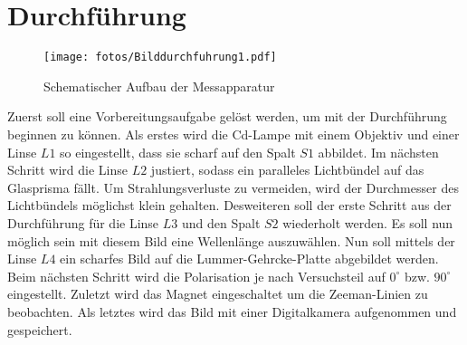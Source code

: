 \section{Durchführung}
\label{sec:Durchführung}
\begin{figure}[h]
	\centering
	\texttt{[image: fotos/Bilddurchfuhrung1.pdf]}
	\caption{Schematischer Aufbau der Messapparatur}
	\label{durch:1}
\end{figure}
Zuerst soll eine Vorbereitungsaufgabe gelöst werden, um mit der Durchführung beginnen zu können.
Als erstes wird die Cd-Lampe mit einem Objektiv und einer Linse $L1$ so eingestellt, dass sie scharf auf den Spalt $S1$ abbildet. Im nächsten Schritt wird die Linse $L2$ justiert, sodass ein paralleles Lichtbündel auf das Glasprisma fällt. Um Strahlungsverluste zu vermeiden, wird der Durchmesser des Lichtbündels möglichst klein gehalten. Desweiteren soll der erste Schritt aus der Durchführung für die Linse $L3$ und den Spalt $S2$ wiederholt werden. Es soll nun möglich sein mit diesem Bild eine Wellenlänge auszuwählen. Nun soll mittels der Linse $L4$ ein scharfes Bild auf die Lummer-Gehrcke-Platte abgebildet werden. Beim nächsten Schritt wird die Polarisation je nach Versuchsteil auf $0^{\circ}$ bzw. $90^{\circ}$ eingestellt. Zuletzt wird das Magnet eingeschaltet um die Zeeman-Linien zu beobachten. Als letztes wird das Bild mit einer Digitalkamera aufgenommen und gespeichert.


